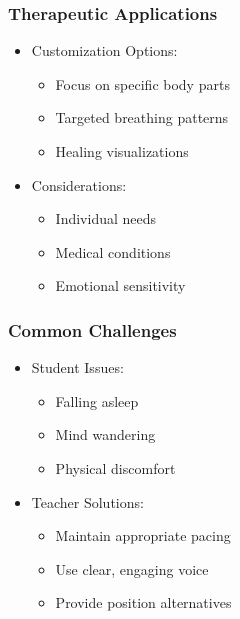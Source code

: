 \begin{frame}[fragile]\frametitle{Therapeutic Applications}
    \begin{itemize}
        \item Customization Options:
            \begin{itemize}
                \item Focus on specific body parts
                \item Targeted breathing patterns
                \item Healing visualizations
            \end{itemize}
        \item Considerations:
            \begin{itemize}
                \item Individual needs
                \item Medical conditions
                \item Emotional sensitivity
            \end{itemize}
    \end{itemize}
\end{frame}

\begin{frame}[fragile]\frametitle{Common Challenges}
    \begin{itemize}
        \item Student Issues:
            \begin{itemize}
                \item Falling asleep
                \item Mind wandering
                \item Physical discomfort
            \end{itemize}
        \item Teacher Solutions:
            \begin{itemize}
                \item Maintain appropriate pacing
                \item Use clear, engaging voice
                \item Provide position alternatives
            \end{itemize}
    \end{itemize}
\end{frame}

